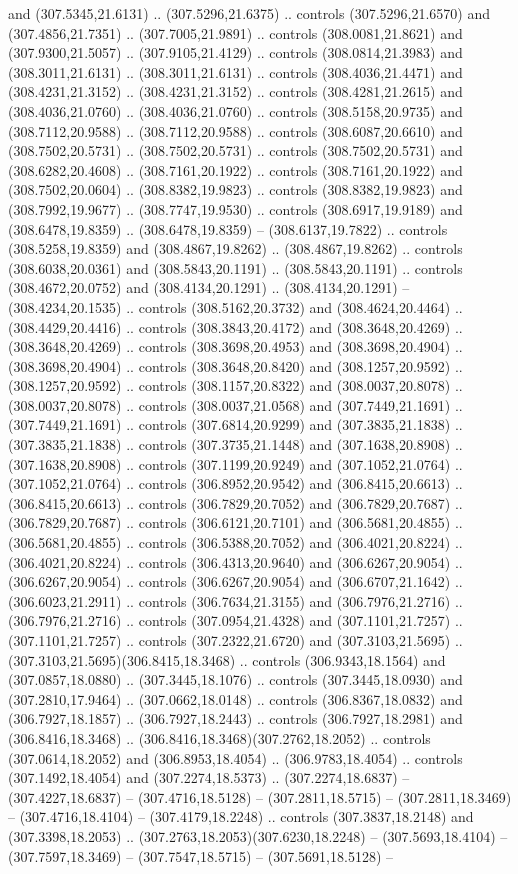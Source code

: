 and (307.5345,21.6131) .. (307.5296,21.6375) .. controls (307.5296,21.6570) and (307.4856,21.7351) .. (307.7005,21.9891) .. controls (308.0081,21.8621) and (307.9300,21.5057) .. (307.9105,21.4129) .. controls (308.0814,21.3983) and (308.3011,21.6131) .. (308.3011,21.6131) .. controls (308.4036,21.4471) and (308.4231,21.3152) .. (308.4231,21.3152) .. controls (308.4281,21.2615) and (308.4036,21.0760) .. (308.4036,21.0760) .. controls (308.5158,20.9735) and (308.7112,20.9588) .. (308.7112,20.9588) .. controls (308.6087,20.6610) and (308.7502,20.5731) .. (308.7502,20.5731) .. controls (308.7502,20.5731) and (308.6282,20.4608) .. (308.7161,20.1922) .. controls (308.7161,20.1922) and (308.7502,20.0604) .. (308.8382,19.9823) .. controls (308.8382,19.9823) and (308.7992,19.9677) .. (308.7747,19.9530) .. controls (308.6917,19.9189) and (308.6478,19.8359) .. (308.6478,19.8359) -- (308.6137,19.7822) .. controls (308.5258,19.8359) and (308.4867,19.8262) .. (308.4867,19.8262) .. controls (308.6038,20.0361) and (308.5843,20.1191) .. (308.5843,20.1191) .. controls (308.4672,20.0752) and (308.4134,20.1291) .. (308.4134,20.1291) -- (308.4234,20.1535) .. controls (308.5162,20.3732) and (308.4624,20.4464) .. (308.4429,20.4416) .. controls (308.3843,20.4172) and (308.3648,20.4269) .. (308.3648,20.4269) .. controls (308.3698,20.4953) and (308.3698,20.4904) .. (308.3698,20.4904) .. controls (308.3648,20.8420) and (308.1257,20.9592) .. (308.1257,20.9592) .. controls (308.1157,20.8322) and (308.0037,20.8078) .. (308.0037,20.8078) .. controls (308.0037,21.0568) and (307.7449,21.1691) .. (307.7449,21.1691) .. controls (307.6814,20.9299) and (307.3835,21.1838) .. (307.3835,21.1838) .. controls (307.3735,21.1448) and (307.1638,20.8908) .. (307.1638,20.8908) .. controls (307.1199,20.9249) and (307.1052,21.0764) .. (307.1052,21.0764) .. controls (306.8952,20.9542) and (306.8415,20.6613) .. (306.8415,20.6613) .. controls (306.7829,20.7052) and (306.7829,20.7687) .. (306.7829,20.7687) .. controls (306.6121,20.7101) and (306.5681,20.4855) .. (306.5681,20.4855) .. controls (306.5388,20.7052) and (306.4021,20.8224) .. (306.4021,20.8224) .. controls (306.4313,20.9640) and (306.6267,20.9054) .. (306.6267,20.9054) .. controls (306.6267,20.9054) and (306.6707,21.1642) .. (306.6023,21.2911) .. controls (306.7634,21.3155) and (306.7976,21.2716) .. (306.7976,21.2716) .. controls (307.0954,21.4328) and (307.1101,21.7257) .. (307.1101,21.7257) .. controls (307.2322,21.6720) and (307.3103,21.5695) .. (307.3103,21.5695)(306.8415,18.3468) .. controls (306.9343,18.1564) and (307.0857,18.0880) .. (307.3445,18.1076) .. controls (307.3445,18.0930) and (307.2810,17.9464) .. (307.0662,18.0148) .. controls (306.8367,18.0832) and (306.7927,18.1857) .. (306.7927,18.2443) .. controls (306.7927,18.2981) and (306.8416,18.3468) .. (306.8416,18.3468)(307.2762,18.2052) .. controls (307.0614,18.2052) and (306.8953,18.4054) .. (306.9783,18.4054) .. controls (307.1492,18.4054) and (307.2274,18.5373) .. (307.2274,18.6837) -- (307.4227,18.6837) -- (307.4716,18.5128) -- (307.2811,18.5715) -- (307.2811,18.3469) -- (307.4716,18.4104) -- (307.4179,18.2248) .. controls (307.3837,18.2148) and (307.3398,18.2053) .. (307.2763,18.2053)(307.6230,18.2248) -- (307.5693,18.4104) -- (307.7597,18.3469) -- (307.7547,18.5715) -- (307.5691,18.5128) -- 